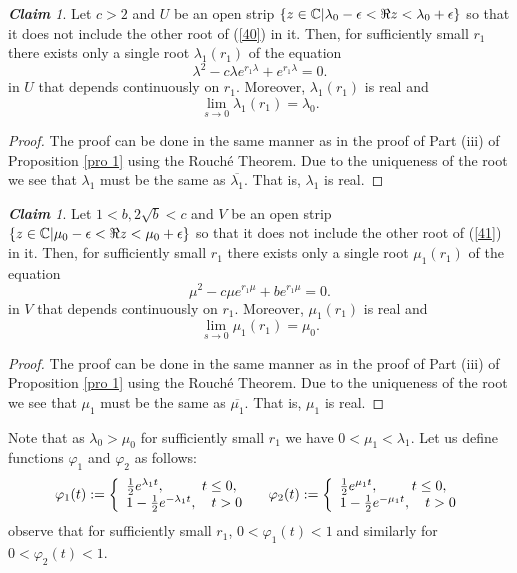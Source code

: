 \documentclass[12pt,letterpaper]{amsart}
\theoremstyle{definition}
\theoremstyle{remark}
\newtheorem{claim}[theorem]{{\bf Claim}}
\numberwithin{equation}{section}
\begin{document}
\begin{claim}\label{claim 4}
Let $c>2$ and $U$ be an open strip $\{ z\in \mathbb C | \lambda_0-\epsilon < \Re z < \lambda_0+\epsilon\}$ so that it does not include the other root of (\ref{40}) in it. Then, for sufficiently small $r_1$ there exists only a single root $\lambda_1(r_1)$ of the equation
\begin{equation}\label{l1}
\lambda^2-c\lambda e^{r_1\lambda}+e^{r_1\lambda }=0.
\end{equation}
in $U$ that depends continuously on $r_1$. Moreover,  $\lambda_1(r_1)$ is real and
\begin{equation}
\lim_{s\to 0} \lambda_1(r_1) =\lambda_0 .
\end{equation}
\end{claim}
\begin{proof}
The proof can be done in the same manner as in the proof of Part (iii) of Proposition \ref{pro 1} using the Rouch\'e Theorem. Due to the uniqueness of the root we see that $\lambda_1$ must be the same as $\overline{\lambda_1}$. That is, $\lambda_1$ is real.
\end{proof}
\begin{claim}\label{claim 5}
Let $1<b, 2\sqrt{b}<c$ and $V$ be an open strip $\{ z\in \mathbb C | \mu_0-\epsilon < \Re z < \mu_0+\epsilon\}$ so that it does not include the other root of (\ref{41}) in it. Then, for sufficiently small $r_1$ there exists only a single root $\mu_1(r_1)$ of the equation
\begin{equation}\label{m1}
\mu^2-c\mu e^{r_1\mu}+be^{r_1\mu }=0.
\end{equation}
in $V$ that depends continuously on $r_1$. Moreover, $\mu_1(r_1)$ is real and
\begin{equation}
\lim_{s\to 0} \mu_1(r_1) =\mu_0 .
\end{equation}
\end{claim}
\begin{proof}
The proof can be done in the same manner as in the proof of Part (iii) of Proposition \ref{pro 1} using the Rouch\'e Theorem. Due to the uniqueness of the root we see that $\mu_1$ must be the same as $\overline{\mu_1}$. That is, $\mu_1$ is real.
\end{proof}
Note that as $\lambda_{0}> \mu_{0}$ for sufficiently small $r_1$ we have $0<\mu_1 <\lambda_1$. Let us define functions $\varphi_{1}$ and $\varphi_{2}$ as follows:
\[
\varphi_{1}(t):=\left\{
\begin{array}
[c]{l}%
\frac{1}{2}e^{\lambda_{1}t},\;\;\;\;\;\;\quad t\leq0,\\
1-\frac{1}{2}e^{-\lambda_{1}t},\quad t>0
\end{array}
\right.  \;\;\;\;\varphi_{2}(t):=\left\{
\begin{array}
[c]{l}%
\frac{1}{2}e^{\mu_{1}t},\;\;\;\;\;\quad t\leq0,\\
1-\frac{1}{2}e^{-\mu_{1}t},\quad t>0
\end{array}
\right.
\]
observe that  for sufficiently small $r_1$, $0<\varphi_{1}(t)<1\;$and similarly for
$0<\varphi_{2}(t)<1.$
\end{document}
